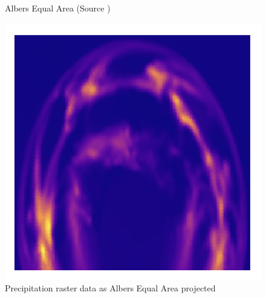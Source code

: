 \begin{figure}[h]
\begin{minipage}{0.30\textwidth}
        \caption{Albers Equal Area (Source \cite{PROJ_SITE})}
        \label{fig:aea_proj}
    \end{minipage}\hfill
    \begin{minipage}{0.30\textwidth}
        \centering
        \includegraphics[width=0.9\linewidth]{figures/chapter-8/prect_aea.png}
        \caption{Precipitation raster data as Albers Equal Area projected}
        \label{fig:aea_prect_raster}
    \end{minipage}\hfill
\end{figure}
\newpage
